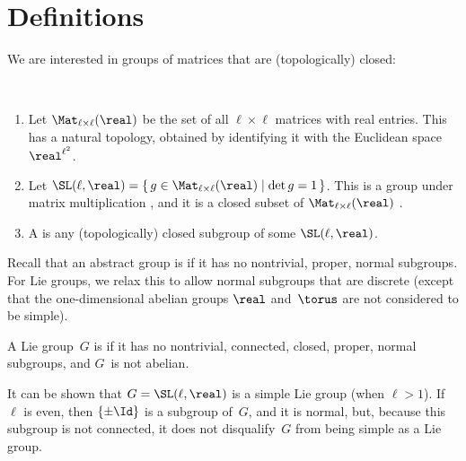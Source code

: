 
\label{SSGrpsChap}


\section{Definitions} \label{SSLieGrpDefnSect}

We are interested in groups of matrices that are (topologically) closed:

\begin{defns} \label{LieDefn} \ 
\noprelistbreak
	\begin{enumerate}
	\item Let $\Mat_{\ell \times \ell}(\real)$ 
	be the set of all $\ell \times \ell$ matrices with real entries. This has a natural topology, obtained by identifying it with the Euclidean space $\real^{\ell^2}$. 
	
	\item Let 
	$\SL(\ell,\real) = \{\, g \in \Mat_{\ell \times \ell}(\real) \mid \det g = 1 \,\}$. This is a group under matrix multiplication , and it is a closed subset of $\Mat_{\ell \times \ell}(\real)$ .

	\item \label{LieDefn-LieGrp}
	A  is any (topologically) closed subgroup of some $\SL(\ell,\real)$. 
	\end{enumerate}
\end{defns}


Recall that an abstract group is  if it has no nontrivial, proper, normal
subgroups. For Lie groups, we relax this to allow normal
subgroups that are discrete (except that the
one-dimensional abelian groups $\real$ and~$\torus$ are not
considered to be simple).

\begin{defn} \label{simpleDefn}
A Lie group~$G$ is  if it has no
nontrivial, connected, closed, proper, normal subgroups,
and $G$~is not abelian.
 \end{defn}

\begin{eg}
It can be shown that $G = \SL(\ell,\real)$ is a simple Lie group (when $\ell > 1$). If $\ell$ is even, then $\{\pm \Id\}$ is a subgroup of~$G$, and it is normal,
but, because this subgroup is not connected, it does not
disqualify~$G$ from being simple as a Lie group.
 \end{eg}

